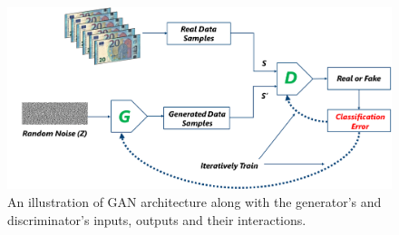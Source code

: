 

\vspace*{0.5cm}
\begin{figure}[H]
        \begin{center}
	    \includegraphics[scale=0.30]{images/Fundamentals/GANStructure.png}
	    \caption[An illustration of \ac{GAN} architecture.]{An illustration of \ac{GAN} architecture along with the generator's and discriminator's inputs, outputs and their interactions.}
	    \label{fig:GANStructure}
	    \end{center}
\end{figure}



